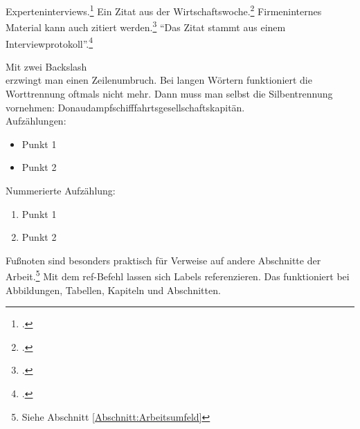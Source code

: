 Experteninterviews.\footcite[Vgl.][S. 7]{Meuser2009} Ein Zitat aus der Wirtschaftswoche.\footcite[Vgl.][S. 32]{WIWO2018}
Firmeninternes Material kann auch zitiert werden.\footcite[Vgl.][]{Firma2018} "`Das Zitat stammt aus einem Interviewprotokoll"'.\footcite{Experte2018}

Mit zwei Backslash \\ erzwingt man einen Zeilenumbruch. Bei langen Wörtern funktioniert die Worttrennung oftmals nicht mehr.
Dann muss man selbst die Silbentrennung vornehmen: Donau\-dampf\-schiff\-fahrts\-gesell\-schafts\-kapitän. \\
Aufzählungen:
\begin{itemize}
  \item Punkt 1
  \item Punkt 2
\end{itemize}
Nummerierte Aufzählung:
\begin{enumerate}
  \item Punkt 1
  \item Punkt 2
\end{enumerate}

Fußnoten sind besonders praktisch für Verweise auf andere Abschnitte der Arbeit.\footnote{Siehe Abschnitt \ref{Abschnitt:Arbeitsumfeld}} 
Mit dem ref-Befehl lassen sich Labels referenzieren. Das funktioniert bei Abbildungen, Tabellen, Kapiteln und Abschnitten.